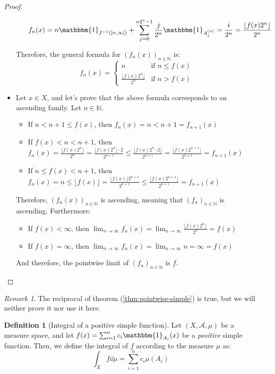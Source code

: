 \documentclass{article}
\theoremstyle{definition}
\newtheorem{definition}{Definition}[section]
\theoremstyle{remark}
\newtheorem*{remark}{Remark}
\theoremstyle{example}
\theoremstyle{notation}
\newcommand{\tif}{\text{if }}
\begin{document}
\begin{proof}
\begin{itemize}
\begin{itemize}
								$$f_n(x) = n\mathbbm{1}_{f^{-1}([n, \infty[)} + \sum_{j=0}^{n2^n - 1} \frac{j}{2^n}\mathbbm{1}_{A_j^{(n)}} = \frac{i}{2^n} = \frac{\lfloor f(x)2^n \rfloor}{2^n}$$
				\end{itemize}
				Therefore, the general formula for $(f_n(x))_{n \in \mathbb{N}}$ is:
				$$f_n(x) = \begin{cases} n & \tif n \leq f(x) \\ \frac{\lfloor f(x)2^n \rfloor}{2^n} & \tif n > f(x)\end{cases}$$
				\item Let $x \in X$, and let's prove that the above formula corresponds to an ascending family. Let $n \in \mathbb{N}$.
				\begin{itemize}
						\item If $n < n + 1 \leq f(x)$, then $f_n(x) = n < n + 1 = f_{n + 1}(x)$
						\item If $f(x) < n < n + 1$, then $f_n(x) = \frac{\lfloor f(x)2^n \rfloor}{2^n} = \frac{\lfloor f(x)2^n \rfloor \cdot 2}{2^{n+1}} \leq \frac{\lfloor f(x)2^n \cdot 2 \rfloor}{2^{n+1}} = \frac{\lfloor f(x)2^{n+1} \rfloor}{2^{n+1}} = f_{n+1}(x)$
						\item If $n \leq f(x) < n+1$, then $f_n(x) = n \leq \lfloor f(x) \rfloor = \frac{\lfloor f(x) \rfloor 2^{n+1}}{2^{n+1}} \leq \frac{\lfloor f(x) 2^{n+1} \rfloor}{2^{n+1}} = f_{n+1}(x)$
				\end{itemize}
				Therefore, $(f_n(x))_{n \in \mathbb{N}}$ is ascending, meaning that $(f_n)_{n \in \mathbb{N}}$ is ascending. Furthermore:
				\begin{itemize}
						\item If $f(x) < \infty$, then $\lim_{n \rightarrow \infty} f_n(x) = \lim_{n \rightarrow \infty} \frac{\lfloor f(x)2^n \rfloor}{2^n} = f(x)$
						\item If $f(x) = \infty$, then $\lim_{n \rightarrow \infty} f_n(x) = \lim_{n \rightarrow \infty} n = \infty = f(x)$
				\end{itemize}
				And therefore, the pointwise limit of $(f_n)_{n \in \mathbb{N}}$ is $f$.
		\end{itemize} 
\end{proof}

\begin{remark}
		The reciprocal of theorem (\ref{thm:pointwise-simple}) is true, but we will neither prove it nor use it here.
\end{remark}

\begin{definition}[Integral of a positive simple function]
		Let $(X, \mathcal{A}, \mu)$ be a measure space, and let $f(x) = \sum_{i=1}^n c_i \mathbbm{1}_{A_i}(x)$ be a \textit{positive} simple function. Then, we define the integral of $f$ according to the measure $\mu$ as:
				$$\int_X f \dd \mu = \sum_{i=1}^n c_i \mu(A_i)$$
\end{definition}
\end{document}
